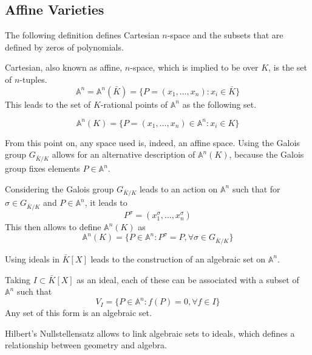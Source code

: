 \subsection{Affine Varieties}
The following definition defines Cartesian $n$-space and the subsets that are defined by zeros of polynomials.
\begin{defn}
	Cartesian, also known as affine, $n$-space, which is implied to be over $K$, is the set of $n$-tuples.
	\begin{equation*}
	\mathbb{A}^n=\mathbb{A}^n(\bar{K})=\{P=(x_1,\dots,x_n):x_i\in\bar{K}\}
	\end{equation*}
	This leads to the set of $K$-rational points of $\mathbb{A}^n$ as the following set.
	
	\begin{equation*}\mathbb{A}^n(K)=\{P=(x_1,\dots,x_n)\in\mathbb{A}^n:x_i\in K\}
	\end{equation*}
\end{defn}

From this point on, any space used is, indeed, an affine space. Using the Galois group $G_{\bar{K}/K}$ allows for an alternative description of $\mathbb{A}^n(K)$, because the Galois group fixes elements $P\in\mathbb{A}^n$.
\begin{rem}
	Considering the Galois group $G_{\bar{K}/K}$ leads to an action on $\mathbb{A}^n$ such that for $\sigma\in G_{\bar{K}/K}$ and $P\in\mathbb{A}^n$, it leads to
	\begin{equation*}
	P^\sigma=(x_1^\sigma,\dots,x_n^\sigma)
	\end{equation*}
	This then allows to define $\mathbb{A}^n(K)$ as
	\begin{equation*}
	\mathbb{A}^n(K)=\{P\in\mathbb{A}^n:P^\sigma=P,\forall\sigma\in G_{\bar{K}/K}\}
	\end{equation*}
\end{rem}

Using ideals in $\bar{K}[X]$ leads to the construction of an algebraic set on $\mathbb{A}^n$.
\begin{defn}
	Taking $I\subset\bar{K}[X]$ as an ideal, each of these can be associated with a subset of $\mathbb{A}^n$ such that
	\begin{equation*}
	V_I=\{P\in\mathbb{A}^n:f(P)=0,\forall f\in I\}
	\end{equation*}
	Any set of this form is an algebraic set.
\end{defn}

Hilbert's Nullstellensatz \cite{Hilbert} allows to link algebraic sets to ideals, which defines a relationship between geometry and algebra.

